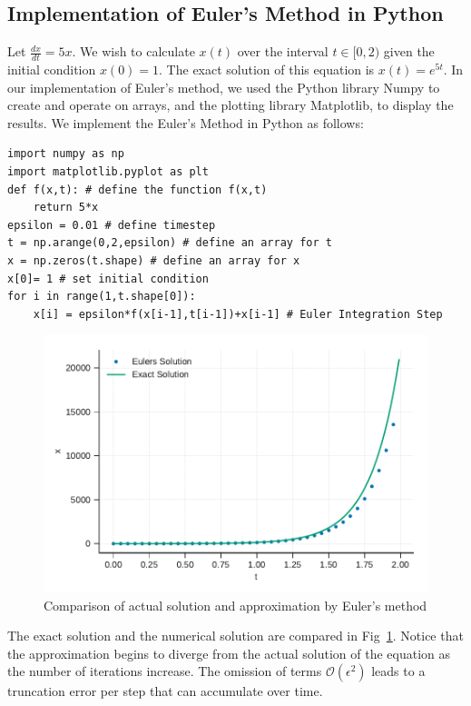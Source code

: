 \documentclass[10pt,letterpaper]{article}
\begin{document}
\subsection*{Implementation of Euler's Method in Python}

Let $\frac{dx}{dt}=5x$. We wish to calculate $x(t)$ over the interval $t\in[0,2)$  given the initial condition $x(0)=1$. The exact solution of this equation is $x(t) = e^{5t}$. In our implementation of Euler's method, we used the Python library Numpy to create and operate on arrays, and the plotting library Matplotlib, to display the results. We implement the Euler's Method in Python as follows:

\begin{verbatim}
import numpy as np
import matplotlib.pyplot as plt
def f(x,t): # define the function f(x,t)
    return 5*x
epsilon = 0.01 # define timestep
t = np.arange(0,2,epsilon) # define an array for t
x = np.zeros(t.shape) # define an array for x
x[0]= 1 # set initial condition
for i in range(1,t.shape[0]):
    x[i] = epsilon*f(x[i-1],t[i-1])+x[i-1] # Euler Integration Step
\end{verbatim}

\begin{figure}
\includegraphics[scale=0.7]{Figures/fig2.pdf} 
\caption{Comparison of actual solution and approximation by Euler's method}
\label{fig:eulerError}
\end{figure}

The exact solution and the numerical solution are compared in Fig~\ref{fig:eulerError}. Notice that the approximation begins to diverge from the actual solution of the equation as the number of iterations increase. The omission of terms $\mathcal{O}(\epsilon^2)$ leads to a truncation error per step that can accumulate over time. 
\end{document}
